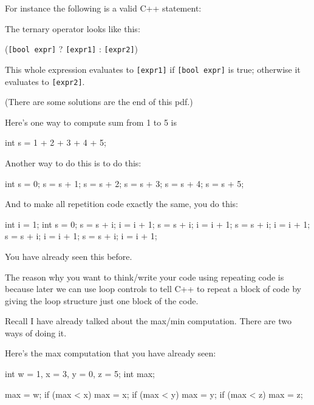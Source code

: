 For instance the following is a valid C++ statement:

The ternary operator looks like this:
\begin{center}
(\texttt{[bool expr]} ? \texttt{[expr1]} : \texttt{[expr2]})
\end{center}
This whole expression evaluates to \texttt{[expr1]} if \texttt{[bool
expr]} is true; otherwise it evaluates to \texttt{[expr2]}.

\newpage{}

(There are some solutions are the end of this pdf.)

Here's one way to compute sum from 1 to 5 is
\begin{console}
int s = 1 + 2 + 3 + 4 + 5; 
\end{console}

Another way to do this is to do this:
\begin{console}
int s = 0;
s = s + 1;
s = s + 2;
s = s + 3;
s = s + 4;
s = s + 5; 
\end{console}

And to make all repetition code exactly the same, you do this:
\begin{console}
int i = 1;
int s = 0;
s = s + i;
i = i + 1;
s = s + i;
i = i + 1;
s = s + i;
i = i + 1;
s = s + i;
i = i + 1;
s = s + i;
i = i + 1; 
\end{console}

You have already seen this before.

The reason why you want to think/write your code using repeating code is
because later we can use loop controls to tell C++ to repeat a block of
code by giving the loop structure just one block of the code.

\newpage{}

Recall I have already talked about the max/min computation. There are
two ways of doing it.

Here's the max computation that you have already seen:
\begin{console}
int w = 1, x = 3, y = 0, z = 5;
int max;

max = w;
if (max < x)
   max = x;
if (max < y)
   max = y;
if (max < z)
   max = z; 
\end{console}

